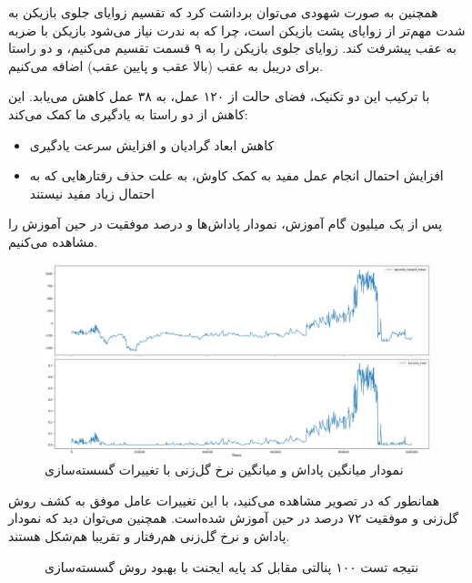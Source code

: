 همچنین به صورت شهودی می‌توان برداشت کرد که تقسیم زوایای جلوی بازیکن به شدت مهم‌تر از زوایای پشت بازیکن است، 
چرا که به ندرت نیاز می‌شود بازیکن با ضربه به عقب پیشرفت کند.
زوایای جلوی بازیکن را به ۹ قسمت تقسیم می‌کنیم، و دو راستا برای دریبل به عقب (بالا عقب و پایین عقب) اضافه می‌کنیم.

با ترکیب این دو تکنیک، فضای حالت از ۱۲۰ عمل، به ۳۸ عمل کاهش می‌یابد.
این کاهش از دو راستا به یادگیری ما کمک می‌کند:
\begin{itemize}
    \item کاهش ابعاد گرادیان و افزایش سرعت یادگیری
    \item افزایش احتمال انجام عمل مفید به کمک کاوش، به علت حذف رفتار‌هایی که به احتمال زیاد مفید نیستند
\end{itemize}
پس از یک میلیون گام آموزش، نمودار پاداش‌ها و درصد موفقیت در حین آموزش را مشاهده می‌کنیم.
\begin{figure}[H]
    \centering
    \includegraphics[width=1\textwidth]{images/dqn_discretization.png}
    \caption{نمودار میانگین پاداش و میانگین نرخ گل‌زنی  با تغییرات گسسته‌سازی}\label{fig:discretization_change}
\end{figure}
همانطور که در تصویر مشاهده می‌کنید، با این تغییرات عامل موفق به کشف روش گل‌زنی و موفقیت ۷۲ درصد در حین آموزش شده‌است.
همچنین می‌توان دید که نمودار پاداش و نرخ گل‌زنی هم‌رفتار و تقریبا هم‌شکل هستند.
\begin{figure}[H]
    \centering
    \caption{نتیجه تست ۱۰۰ پنالتی مقابل کد پایه ایجنت با بهبود روش گسسته‌سازی}\label{fig:discretization_pie}
\end{figure}


